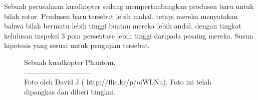 \begin{exercisewrap}
\begin{nexercise}
\label{carWheelBladeManufacturer}%
Sebuah perusahaan kuadkopter sedang mempertimbangkan produsen baru
untuk bilah rotor.
Produsen baru tersebut lebih mahal,
tetapi mereka menyatakan bahwa
bilah bermutu lebih tinggi buatan mereka lebih andal,
dengan tingkat kelulusan inspeksi 3 poin persentase lebih tinggi daripada
pesaing mereka.
Susun hipotesis yang sesuai untuk pengujian tersebut.\footnotemark
\end{nexercise}
\end{exercisewrap}

\captionsetup{width=85mm}

\begin{figure}[h]
\centering
{}
\caption{Sebuah kuadkopter Phantom.\vspace{-1mm} \\
   -----------------------------\vspace{-2mm}\\
   {\footnotesize Foto oleh David J
   (
       {http://flic.kr/p/oiWLNu}).
   Foto ini telah dipangkas dan diberi bingkai.}}
\label{quadcopter_david_j}
\end{figure}

\captionsetup{width=\mycaptionwidth}



